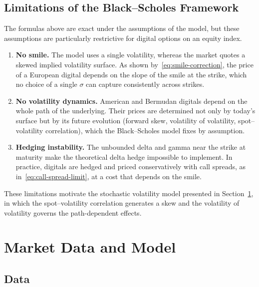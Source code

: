 \documentclass[11pt,a4paper]{article}
\theoremstyle{remark}
\begin{document}
\subsection{Limitations of the Black--Scholes Framework}
\label{subsec:bs-limits}

The formulas above are exact under the assumptions of the model, but these
assumptions are particularly restrictive for digital options on an equity
index.

\begin{enumerate}
  \item \textbf{No smile.} The model uses a single volatility, whereas the
        market quotes a skewed implied volatility surface. As shown
        by~\eqref{eq:smile-correction}, the price of a European digital
        depends on the slope of the smile at the strike, which no choice of a
        single $\sigma$ can capture consistently across strikes.
  \item \textbf{No volatility dynamics.} American and Bermudan digitals depend
        on the whole path of the underlying. Their prices are determined not
        only by today's surface but by its future evolution (forward skew,
        volatility of volatility, spot--volatility correlation), which the
        Black--Scholes model fixes by assumption.
  \item \textbf{Hedging instability.} The unbounded delta and gamma near the
        strike at maturity make the theoretical delta hedge impossible to
        implement. In practice, digitals are hedged and priced conservatively
        with call spreads, as in~\eqref{eq:call-spread-limit}, at a cost that
        depends on the smile.
\end{enumerate}

These limitations motivate the stochastic volatility model presented in
Section~\ref{sec:data}, in which the spot--volatility correlation generates
a skew and the volatility of volatility governs the path-dependent effects.

\clearpage

\section{Market Data and Model}
\label{sec:data}

\subsection{Data}
\end{document}
